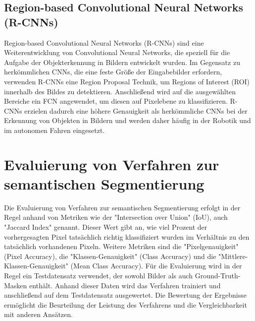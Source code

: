 \subsection{Region-based Convolutional Neural Networks (R-CNNs)}
Region-based Convolutional Neural Networks (R-CNNs) sind eine Weiterentwicklung
von Convolutional Neural Networks, die speziell für die Aufgabe der
Objekterkennung in Bildern entwickelt wurden. Im Gegensatz zu herkömmlichen
CNNs, die eine feste Größe der Eingabebilder erfordern, verwenden R-CNNs eine
Region Proposal Technik, um Regions of Interest (ROI) innerhalb des Bildes zu
detektieren. Anschließend wird auf die ausgewählten Bereiche ein FCN
angewendet, um diesen auf Pixelebene zu klassifizieren. R-CNNs erzielen dadurch
eine höhere Genauigkeit als herkömmliche CNNs bei der Erkennung von Objekten in
Bildern und werden daher häufig in der Robotik und im autonomen Fahren
eingesetzt. \cite{8237584}



\section{Evaluierung von Verfahren zur semantischen Segmentierung}
Die Evaluierung von Verfahren zur semantischen Segmentierung erfolgt in der
Regel anhand von Metriken wie der "Intersection over Union" (IoU), auch
"Jaccard Index" genannt. Dieser Wert gibt an, wie viel Prozent der
vorhergesagten Pixel tatsächlich richtig klassifiziert wurden im Verhältnis zu
den tatsächlich vorhandenen Pixeln. Weitere Metriken sind die
"Pixelgenauigkeit" (Pixel Accuracy), die "Klassen-Genauigkeit" (Class Accuracy)
und die "Mittlere-Klassen-Genauigkeit" (Mean Class Accuracy). Für die
Evaluierung wird in der Regel ein Testdatensatz verwendet, der sowohl Bilder
als auch Ground-Truth-Masken enthält. Anhand dieser Daten wird das Verfahren
trainiert und anschließend auf dem Testdatensatz ausgewertet. Die Bewertung der
Ergebnisse ermöglicht die Beurteilung der Leistung des Verfahrens und die
Vergleichbarkeit mit anderen Ansätzen.
\